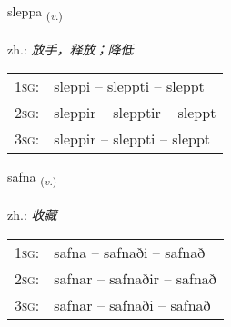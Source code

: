 \documentclass[frontgrid, backgrid]{flacards}\usepackage[]{graphicx}\usepackage[]{xcolor}
\begin{document}
\renewcommand{\flhead}{\vskip5pt \fboxsep=0pt {\small\bfseries\footnotesize Sagnorð | 动词}}
\renewcommand{\fcfoot}{\vskip5pt \fboxsep=0pt \hspace{2pt}{\small\bfseries\footnotesize 1K}}

\renewcommand{\blhead}{\vskip5pt {\small\bfseries\footnotesize Sagnorð | 动词 }}
\renewcommand{\bcfoot}{\vskip5pt \hspace{2pt}{\small\bfseries\footnotesize 1K}}


{sleppa \small{\textsubscript{(\textit{v.})}} \\[1ex] %
\textphonetic{[stlɛhpa]} \\
zh.: \emph{放手，释放；降低} \\  [2ex]
\renewcommand*{\arraystretch}{0.8}
\begin{tabular}{p{1cm}l}
\textsc{1sg}: & sleppi -- sleppti -- sleppt \\ 
\textsc{2sg}: & sleppir -- slepptir -- sleppt \\ 
\textsc{3sg}: & sleppir -- sleppti -- sleppt \\ 
\end{tabular}
}

\renewcommand{\flhead}{\vskip5pt \fboxsep=0pt {\small\bfseries\footnotesize Sagnorð | 动词}}
\renewcommand{\fcfoot}{\vskip5pt \fboxsep=0pt \hspace{2pt}{\small\bfseries\footnotesize 1K}}

\renewcommand{\blhead}{\vskip5pt {\small\bfseries\footnotesize Sagnorð | 动词 }}
\renewcommand{\bcfoot}{\vskip5pt \hspace{2pt}{\small\bfseries\footnotesize 1K}}


{safna \small{\textsubscript{(\textit{v.})}} \\[1ex] %
\textphonetic{[sapna]} \\
zh.: \emph{收藏} \\  [2ex]
\renewcommand*{\arraystretch}{0.8}
\begin{tabular}{p{1cm}l}
\textsc{1sg}: & safna -- safnaði -- safnað \\ 
\textsc{2sg}: & safnar -- safnaðir -- safnað \\ 
\textsc{3sg}: & safnar -- safnaði -- safnað \\ 
\end{tabular}
}
\end{document}
